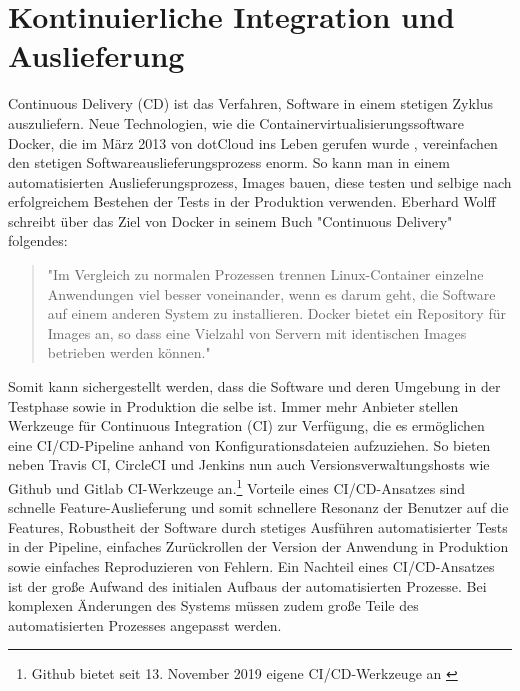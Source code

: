 \section{Kontinuierliche Integration und Auslieferung}
\label{sec:kontinuierlicheintegrationundauslieferung}
Continuous Delivery (CD) ist das Verfahren, Software in einem stetigen Zyklus auszuliefern.
Neue Technologien, wie die Containervirtualisierungssoftware Docker,
die im März 2013 von dotCloud ins Leben gerufen wurde \cite{DockerAbout2014}, vereinfachen
den stetigen Softwareauslieferungsprozess enorm. So kann man in einem automatisierten
Auslieferungsprozess, Images bauen, diese testen und selbige nach erfolgreichem
Bestehen der Tests in der Produktion verwenden. Eberhard Wolff schreibt über das Ziel von Docker in
seinem Buch "Continuous Delivery" folgendes:

\begin{quote}
"Im Vergleich zu normalen Prozessen trennen Linux-Container
einzelne Anwendungen viel besser voneinander, wenn es darum geht, die Software auf einem anderen
System zu installieren. Docker bietet ein Repository für Images an, so dass eine Vielzahl
von Servern mit identischen Images betrieben werden können."\cite[S. 56]{ContinuousDeliveryWolff}
\end{quote}

Somit kann sichergestellt werden, dass die Software und deren Umgebung in der Testphase
sowie in Produktion die selbe ist. Immer mehr Anbieter stellen Werkzeuge für Continuous Integration (CI) zur Verfügung,
die es ermöglichen eine CI/CD-Pipeline anhand von Konfigurationsdateien aufzuziehen. So bieten
neben Travis CI, CircleCI und Jenkins nun auch Versionsverwaltungshosts wie Github und
Gitlab CI-Werkzeuge an.\footnote{Github bietet seit 13. November 2019 eigene CI/CD-Werkzeuge an \cite{GithubCIToolsHeise}}
Vorteile eines CI/CD-Ansatzes sind schnelle Feature-Auslieferung und somit schnellere Resonanz der Benutzer auf die Features,
Robustheit der Software durch stetiges Ausführen automatisierter Tests in der Pipeline, einfaches Zurückrollen
der Version der Anwendung in Produktion sowie einfaches Reproduzieren von Fehlern. Ein Nachteil eines CI/CD-Ansatzes ist
der große Aufwand des initialen Aufbaus der automatisierten Prozesse. Bei komplexen Änderungen des Systems müssen zudem
große Teile des automatisierten Prozesses angepasst werden.
